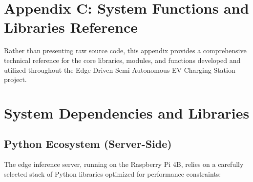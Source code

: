




\section*{Appendix C: System Functions and Libraries Reference}

Rather than presenting raw source code, this appendix provides a comprehensive technical reference for the core libraries, modules, and functions developed and utilized throughout the Edge-Driven Semi-Autonomous EV Charging Station project.

\section{System Dependencies and Libraries}

\subsection{Python Ecosystem (Server-Side)}
The edge inference server, running on the Raspberry Pi 4B, relies on a carefully selected stack of Python libraries optimized for performance constraints:

